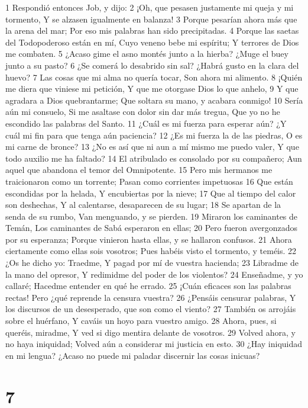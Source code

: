 1 Respondió entonces Job, y dijo:
2 ¡Oh, que pesasen justamente mi queja y mi tormento,
Y se alzasen igualmente en balanza!
3 Porque pesarían ahora más que la arena del mar;
Por eso mis palabras han sido precipitadas.
4 Porque las saetas del Todopoderoso están en mí,
Cuyo veneno bebe mi espíritu;
Y terrores de Dios me combaten.
5 ¿Acaso gime el asno montés junto a la hierba?
¿Muge el buey junto a su pasto?
6 ¿Se comerá lo desabrido sin sal?
¿Habrá gusto en la clara del huevo?
7 Las cosas que mi alma no quería tocar,
Son ahora mi alimento.
8 ¡Quién me diera que viniese mi petición,
Y que me otorgase Dios lo que anhelo,
9 Y que agradara a Dios quebrantarme;
Que soltara su mano, y acabara conmigo! 
10 Sería aún mi consuelo,
Si me asaltase con dolor sin dar más tregua,
Que yo no he escondido las palabras del Santo.
11 ¿Cuál es mi fuerza para esperar aún?
¿Y cuál mi fin para que tenga aún paciencia? 
12 ¿Es mi fuerza la de las piedras,
O es mi carne de bronce?
13 ¿No es así que ni aun a mí mismo me puedo valer,
Y que todo auxilio me ha faltado?
14 El atribulado es consolado por su compañero;
Aun aquel que abandona el temor del Omnipotente. 
15 Pero mis hermanos me traicionaron como un torrente;
Pasan como corrientes impetuosas
16 Que están escondidas por la helada,
Y encubiertas por la nieve;
17 Que al tiempo del calor son deshechas,
Y al calentarse, desaparecen de su lugar;
18 Se apartan de la senda de su rumbo,
Van menguando, y se pierden.
19 Miraron los caminantes de Temán,
Los caminantes de Sabá esperaron en ellas;
20 Pero fueron avergonzados por su esperanza;
Porque vinieron hasta ellas, y se hallaron confusos.
21 Ahora ciertamente como ellas sois vosotros;
Pues habéis visto el tormento, y teméis.
22 ¿Os he dicho yo: Traedme,
Y pagad por mí de vuestra hacienda;
23 Libradme de la mano del opresor,
Y redimidme del poder de los violentos? 
24 Enseñadme, y yo callaré;
Hacedme entender en qué he errado.
25 ¡Cuán eficaces son las palabras rectas!
Pero ¿qué reprende la censura vuestra?
26 ¿Pensáis censurar palabras,
Y los discursos de un desesperado, que son como el viento?
27 También os arrojáis sobre el huérfano,
Y caváis un hoyo para vuestro amigo.
28 Ahora, pues, si queréis, miradme,
Y ved si digo mentira delante de vosotros.
29 Volved ahora, y no haya iniquidad;
Volved aún a considerar mi justicia en esto.
30 ¿Hay iniquidad en mi lengua?
¿Acaso no puede mi paladar discernir las cosas inicuas?

\chapter{7}

